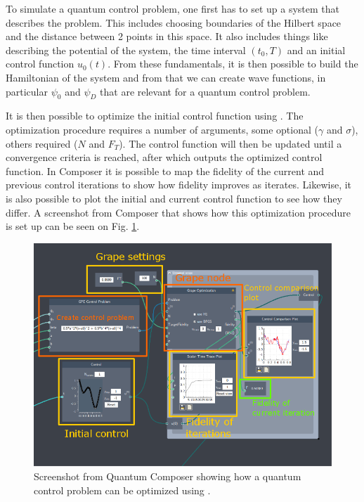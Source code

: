 \documentclass[aps,pra,reprint,superscriptaddress]{revtex4-1}
\begin{document}
To simulate a quantum control problem, one first has to set up a system that describes the problem. This includes choosing boundaries of the Hilbert space and the distance between 2 points in this space. It also includes things like describing the potential of the system, the time interval $(t_0, T)$ and an initial control function $u_0(t)$. From these fundamentals, it is then possible to build the Hamiltonian of the system and from that we can create wave functions, in particular $\psi_0$ and $\psi_D$ that are relevant for a quantum control problem.


It is then possible to optimize the initial control function using . The optimization procedure requires a number of arguments, some optional ($\gamma$ and $\sigma$), others required ($N$ and $F_T$). The control function will then be updated until a convergence criteria is reached, after which  outputs the optimized control function. In Composer it is possible to map the fidelity of the current and previous control iterations to show how fidelity improves as  iterates. Likewise, it is also possible to plot the initial and current control function to see how they differ. A screenshot from Composer that shows how this optimization procedure is set up can be seen on Fig. \ref{fig:composerScreens}.

\begin{figure}
	\centering
	\includegraphics[width=\columnwidth]{graphics/composerScreens/grape_highlight.png}
	\caption{Screenshot from Quantum Composer showing how a quantum control problem can be optimized using .}
	\label{fig:composerScreens}
\end{figure}
\end{document}
